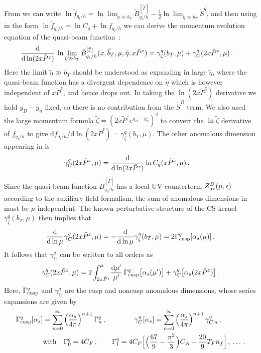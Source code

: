 \documentclass[11pt,a4paper]{article}
\newcommand{\df}{\mathrm{d}}
\newcommand{\nn}{\nonumber}
\newcommand{\as}{\alpha_s}
\newcommand{\q}{q_i}
\begin{document}
From  we can write $\ln \tilde f_{\q/h}= \ln \lim_{\tilde \eta\gg b_T} \tilde B^{[\tilde\Gamma]}_{\q/h} - \frac12 \ln \lim_{\tilde \eta\gg b_T} \tilde S^q$, and then using  in the form $\ln\tilde f_{\q/h} = \ln C_q + \ln f_{\q/h}$
we can derive the momentum evolution equation of the quasi-beam function~\cite{Ji:2014hxa}:
\begin{align}\label{eq:rge1}
	{\df \over \df \ln (2x \tilde P^z) }\:\ln \lim_{\tilde \eta \gg b_T} \tilde B_{\q/h}^{[\tilde \Gamma]}(x,\vec{b}_T,\mu,\tilde\eta, x \tilde P^z) &= \gamma_\zeta^q(b_T,\mu) + \gamma_C^q(2x \tilde P^z, \mu)\,.
\end{align}
Here the limit $\tilde \eta \gg b_T$ should be understood as expanding in large $\tilde\eta$, where the quasi-beam function has a divergent dependence on $\tilde\eta$ which is however independent of $x\tilde P^z$, and hence drops out. In taking the $\ln(2x\tilde P^z)$ derivative we hold $y_B-y_n$ fixed, so there is no contribution from the $\tilde S^R$ term. We also used the large momentum formula $\tilde\zeta = (2 x \tilde P^z e^{y_B-y_n})^2$ to convert the $\ln\tilde\zeta$ derivative of $f_{\q/h}$ to give $\df f_{\q/h}/\df\ln(2x\tilde P^z) = \gamma_\zeta^q(b_T,\mu)$. 
The other anomalous dimension appearing in  is
\begin{align} \label{eq:rge2}
	\gamma_C^q(2x \tilde P^z, \mu) &= {\df\over \df\ln (2x \tilde P^z) } 	\ln C_q(x \tilde P^z, \mu) \,.
\end{align}
Since the quasi-beam function $\tilde B_{\q/h}^{[\tilde\Gamma]}$ has a local UV counterterm $Z_{\rm uv}^B(\mu,\epsilon)$ according to the auxiliary field formalism, the sum of anomalous dimensions in  must be $\mu$ independent.  The known perturbative structure of the CS kernel $\gamma_\zeta^q(b_T,\mu)$ then implies that
\begin{align}
 \frac{\df}{\df\ln\mu} \gamma_C^q(2x \tilde P^z, \mu)
 = - \frac{\df}{\df\ln\mu}  \gamma_\zeta^q(b_T,\mu)
 = 2 \Gamma_{\rm cusp}^q[\as(\mu)]
\,.\end{align}
It follows that $\gamma_C^q$ can be written to all orders as
\begin{align}
  \gamma_C^q(2x\tilde P^z,\mu) = 2 \int_{2x\tilde P^z}^{\mu} \! \frac{\df\mu'}{\mu'} \: \Gamma_{\rm cusp}^q\big[\alpha_s(\mu')\big]
  + \gamma_C^q\big[\alpha_s(2 x\tilde P^z)\big] \,.
\end{align}
Here, $\Gamma_{\rm cusp}^q$ and $\gamma_C^q$ are the cusp and noncusp anomalous dimensions,
whose series expansions are given by
\begin{align}
 \Gamma_{\rm cusp}^q[\alpha_s] 
  &= \sum_{n=0}^\infty \Big(\frac{\alpha_s}{4\pi}\Big)^{n+1}  \,
   \Gamma_n^{q} \,,
 \qquad\qquad
 \gamma_C^q[\alpha_s]
   = \sum_{n=0}^\infty \Big(\frac{\alpha_s}{4\pi}\Big)^{n+1} \, 
   \gamma_{C\,n}^{q}
 \,, \\
 & \text{with}\ \ \
 \Gamma_0^{q}=4 C_F \,,\qquad
  \Gamma_1^{q}
   = 4C_F \Big[ \Big(\frac{67}{9}-\frac{\pi^2}{3}\Big) C_A 
   -\frac{20}{9} T_F n_f \Big] 
  \,, \: \ldots 
 \,.\nn
\end{align}
\end{document}
